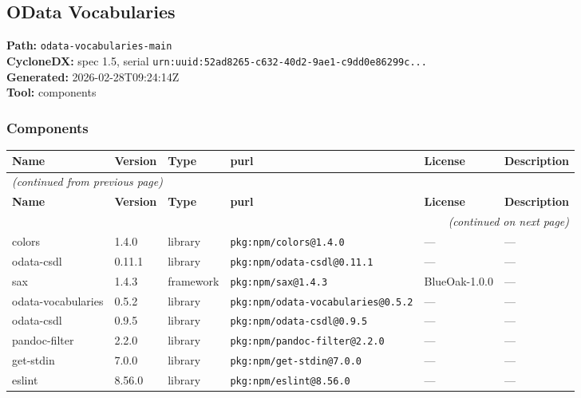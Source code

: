 \documentclass[11pt,a4paper]{article}
\begin{document}
\subsection{OData Vocabularies}
\textbf{Path:} \texttt{odata-vocabularies-main}
\\ \textbf{CycloneDX:} spec 1.5, serial \texttt{urn:uuid:52ad8265-c632-40d2-9ae1-c9dd0e86299c...}
\\ \textbf{Generated:} 2026-02-28T09:24:14Z
\\ \textbf{Tool:} components

\subsubsection*{Components}
\begin{longtable}{|p{4cm}|p{2cm}|p{1.6cm}|p{5cm}|p{1.5cm}|p{3.5cm}|}
\toprule
\rowcolor{sbomhdr}\textbf{Name} & \textbf{Version} & \textbf{Type} & \textbf{purl} & \textbf{License} & \textbf{Description} \\
\midrule
\endfirsthead
\multicolumn{6}{l}{\small\itshape (continued from previous page)} \\
\toprule
\rowcolor{sbomhdr}\textbf{Name} & \textbf{Version} & \textbf{Type} & \textbf{purl} & \textbf{License} & \textbf{Description} \\
\midrule
\endhead
\midrule
\multicolumn{6}{r}{\small\itshape (continued on next page)} \\
\endfoot
\bottomrule
\endlastfoot
\raggedright colors & 1.4.0 & library & \small\texttt{pkg:npm/colors@1.4.0} & — & \small — \\
\raggedright odata-csdl & 0.11.1 & library & \small\texttt{pkg:npm/odata-csdl@0.11.1} & — & \small — \\
\raggedright sax & 1.4.3 & framework & \small\texttt{pkg:npm/sax@1.4.3} & BlueOak-1.0.0 & \small — \\
\raggedright odata-vocabularies & 0.5.2 & library & \small\texttt{pkg:npm/odata-vocabularies@0.5.2} & — & \small — \\
\raggedright odata-csdl & 0.9.5 & library & \small\texttt{pkg:npm/odata-csdl@0.9.5} & — & \small — \\
\raggedright pandoc-filter & 2.2.0 & library & \small\texttt{pkg:npm/pandoc-filter@2.2.0} & — & \small — \\
\raggedright get-stdin & 7.0.0 & library & \small\texttt{pkg:npm/get-stdin@7.0.0} & — & \small — \\
\raggedright eslint & 8.56.0 & library & \small\texttt{pkg:npm/eslint@8.56.0} & — & \small — \\

\end{longtable}
\end{document}
